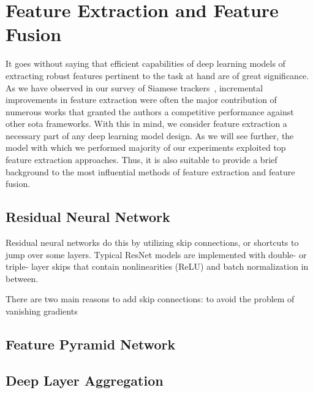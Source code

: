 \section{Feature Extraction and Feature Fusion}
\label{sec:FeatureExtractionFusion}

It goes without saying that efficient capabilities of deep learning models of extracting robust features pertinent to the task at hand are of great significance. As we have observed in our survey of Siamese trackers~\cite{ondrasovic2021siamese}, incremental improvements in feature extraction were often the major contribution of numerous works that granted the authors a competitive performance against other \gls{sota} frameworks. With this in mind, we consider feature extraction a necessary part of any deep learning model design. As we will see further, the model with which we performed majority of our experiments exploited top feature extraction approaches. Thus, it is also suitable to provide a brief background to the most influential methods of feature extraction and feature fusion.

\subsection{Residual Neural Network}
\label{ssec:ResidualNeuralNet}

Residual neural networks do this by utilizing skip connections, or shortcuts to jump over some layers. Typical ResNet models are implemented with double- or triple- layer skips that contain nonlinearities (ReLU) and batch normalization in between.

There are two main reasons to add skip connections: to avoid the problem of vanishing gradients

\subsection{Feature Pyramid Network}
\label{ssec:FeaturePyramidNetwork}

\subsection{Deep Layer Aggregation}
\label{ssec:DeepLayerAggregation}

